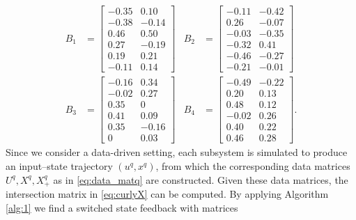 \documentclass[11pt]{article}
\theoremstyle{plain}
\theoremstyle{definition}
\theoremstyle{remark}
\begin{document}
\begin{equation*}
\begin{aligned}
 B_{1} &= \left[\begin{smallmatrix}
    -0.35 & 0.10 \\
    -0.38 & -0.14 \\
    0.46 & 0.50 \\
    0.27 & -0.19 \\
    0.19 & 0.21 \\
    -0.11 & 0.14
\end{smallmatrix}\right]&
    B_{2} &= \left[\begin{smallmatrix}
    -0.11 & -0.42 \\
    0.26 & -0.07 \\
    -0.03 & -0.35 \\
    -0.32 & 0.41 \\
    -0.46 & -0.27 \\
    -0.21 & -0.01
\end{smallmatrix}\right]\\
    B_{3} &= \left[\begin{smallmatrix}
    -0.16 & 0.34 \\
    -0.02 & 0.27 \\
    0.35 & 0 \\
    0.41 & 0.09 \\
    0.35 & -0.16 \\
    0 & 0.03
\end{smallmatrix}\right]&
    B_{4} &= \left[\begin{smallmatrix}
    -0.49 & -0.22 \\
    0.20 & 0.13 \\
    0.48 & 0.12 \\
    -0.02 & 0.26 \\
    0.40 & 0.22 \\
    0.46 & 0.28
\end{smallmatrix}\right].
\end{aligned}
\end{equation*}
Since we consider a data-driven setting, each subsystem is simulated to produce an input--state trajectory $(u^q,x^q)$, from which the corresponding data matrices $U^q,X^q,X_+^q$ as in \eqref{eq:data_matq} are constructed. Given these data matrices, the intersection matrix in \eqref{eq:curlyX} can be computed. By applying Algorithm \ref{alg:1} we find a switched state feedback with matrices
\end{document}
